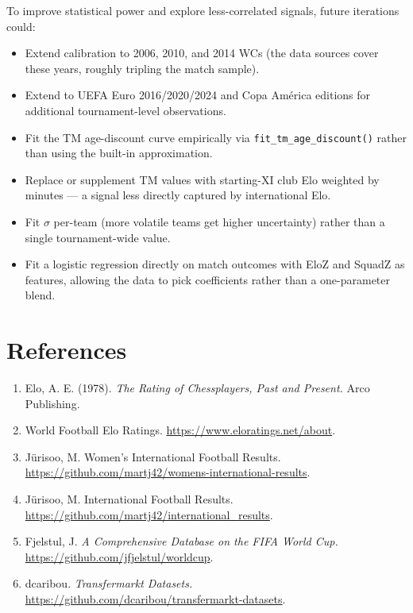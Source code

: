 \documentclass[11pt]{article}
\begin{document}
To improve statistical power and explore less-correlated signals, future iterations could:
\begin{itemize}[nosep]
    \item Extend calibration to 2006, 2010, and 2014 WCs (the data sources cover these years, roughly tripling the match sample).
    \item Extend to UEFA Euro 2016/2020/2024 and Copa Am\'erica editions for additional tournament-level observations.
    \item Fit the TM age-discount curve empirically via \texttt{fit\_tm\_age\_discount()} rather than using the built-in approximation.
    \item Replace or supplement TM values with starting-XI club Elo weighted by minutes --- a signal less directly captured by international Elo.
    \item Fit $\sigma$ per-team (more volatile teams get higher uncertainty) rather than a single tournament-wide value.
    \item Fit a logistic regression directly on match outcomes with EloZ and SquadZ as features, allowing the data to pick coefficients rather than a one-parameter blend.
\end{itemize}

\section*{References}

\begin{enumerate}[nosep]
    \item Elo, A. E. (1978). \textit{The Rating of Chessplayers, Past and Present.} Arco Publishing.
    \item World Football Elo Ratings. \url{https://www.eloratings.net/about}.
    \item J\"urisoo, M. Women's International Football Results. \url{https://github.com/martj42/womens-international-results}.
    \item J\"urisoo, M. International Football Results. \url{https://github.com/martj42/international_results}.
    \item Fjelstul, J. \textit{A Comprehensive Database on the FIFA World Cup.} \url{https://github.com/jfjelstul/worldcup}.
    \item dcaribou. \textit{Transfermarkt Datasets.} \url{https://github.com/dcaribou/transfermarkt-datasets}.
\end{enumerate}
\end{document}
